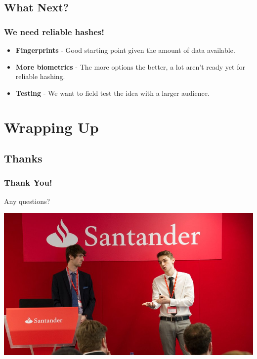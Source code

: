 \documentclass{beamer}
\begin{document}
    \subsection{What Next?}
      \begin{frame}
        \frametitle{We need reliable hashes!}
        \begin{itemize}
          \item \textbf{Fingerprints} - Good starting point given the amount of
                data available.
          \item \textbf{More biometrics} - The more options the better, a lot
                aren't ready yet for reliable hashing.
          \item \textbf{Testing} - We want to field test the idea with a larger
                audience.
        \end{itemize}
      \end{frame}
  \section{Wrapping Up}
    \subsection{Thanks}
      \begin{frame}
        \frametitle{Thank You!}
        Any questions?
        \vfill
        \begin{center}
          \includegraphics[scale=0.3]{santander}
        \end{center}
      \end{frame}
\end{document}
